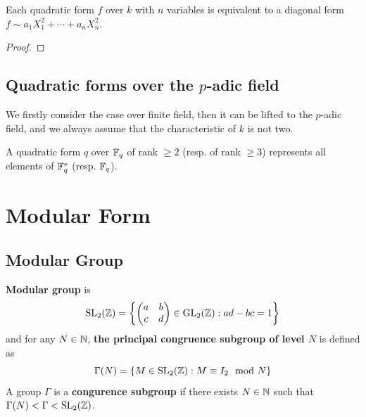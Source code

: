 \begin{colortheorem}
    Each quadratic form \(f\) over \(k\) with \(n\) variables is equivalent to a diagonal form \(f \sim a_1X_1^2 + \cdots + a_n X_n^2\).
\end{colortheorem}

\begin{proof}
    
\end{proof}




\newpage


\subsection{Quadratic forms over \texorpdfstring{the $p$-adic field}{the p-adic field}}

We firstly consider the case over finite field, then it can be lifted to the \(p\)-adic field, and we always assume that the characteristic of \(k\) is not two.

\begin{proposition}
    A quadratic form \(q\) over \(\mathbb{F}_q\) of rank \(\geq 2\) (resp. of rank \(\geq 3\)) represents all elements of \(\mathbb{F}_q^*\) (resp. \(\mathbb{F}_q\)).
\end{proposition}

\newpage

\section{Modular Form}

\subsection{Modular Group }

\begin{definition}
    \textbf{Modular group} is 
    \[\mathrm{SL}_2(\mathbb{Z}) = \left\{ \begin{pmatrix} a & b \\ c & d \end{pmatrix} \in \mathrm{GL}_2(\mathbb{Z}) : ad - bc = 1 \right\}\]
    and for any \(N \in \mathbb{N}\), \textbf{the principal congruence subgroup of level \(N\) }is defined as
    \[\Gamma(N) = \{M \in \mathrm{SL}_2(\mathbb{Z}) : M \equiv I_2 \mod N\}\]
    A group \(\Gamma\) is a  \textbf{congurence subgroup} if there exists \(N \in \mathbb{N}\) such that \(\Gamma(N) < \Gamma < \mathrm{SL}_2(\mathbb{Z})\).
\end{definition}

